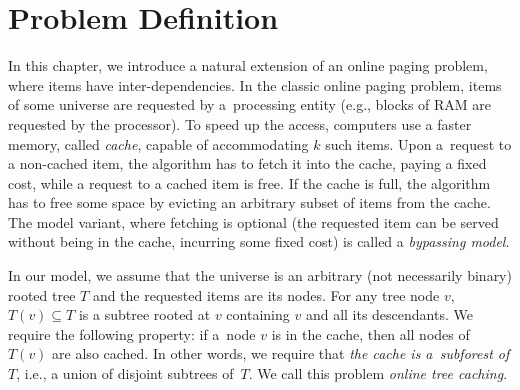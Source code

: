 \section{Problem Definition}\label{sec:preliminaries}

%

In this chapter, we introduce a natural extension of an online paging problem, where
items have inter-de\-pen\-den\-cies.
In the classic online paging problem, items of some universe are requested by
a~processing entity (e.g., blocks of RAM are requested by the processor). To
speed up the access, computers use a faster memory, called
\emph{cache}, capable of accommodating $k$ such items. Upon a~request to a
non-cached item, the algorithm has to fetch it into the cache, paying a fixed
cost, while a request to a cached item is free. If the cache is full, the
algorithm has to free some space by evicting an arbitrary subset of items from
the cache.
The model variant, where fetching is optional (the requested item can be served without being in the cache, incurring some fixed cost) is called a \emph{bypassing model}.


In our model, we assume that the universe is
an arbitrary (not necessarily binary) rooted tree $T$ and the requested items
are its nodes. For any tree node $v$, $T(v) \subseteq T$ is a subtree rooted
at $v$ containing $v$ and all its descendants. We require the following
property: if a~node $v$ is in the cache, then all nodes of $T(v)$ are also
cached. In other words, we require that \emph{the cache is a~subforest of
$T$}, i.e., a union of disjoint subtrees of~$T$.  We call this problem
\emph{online tree caching}.

